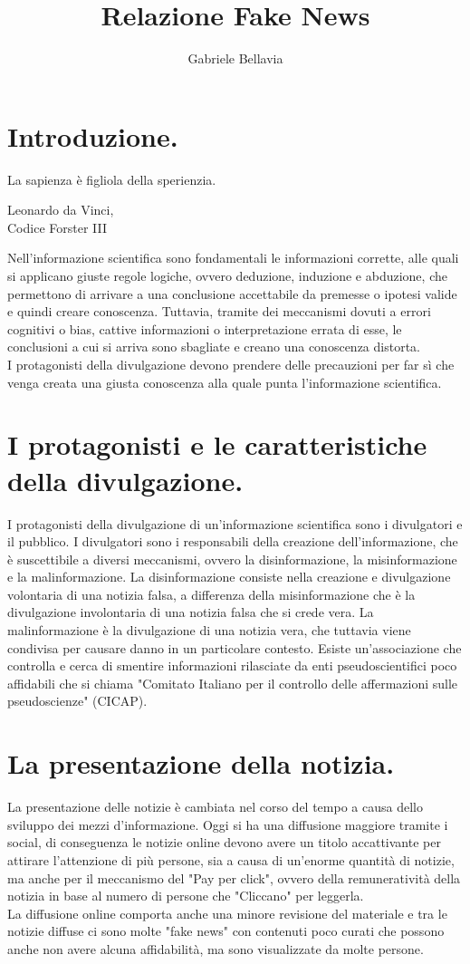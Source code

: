 \documentclass[a4paper]{article}
\title{Relazione Fake News}
\author{Gabriele Bellavia}
\begin{document}
\maketitle

\section*{Introduzione.}
\epigraph{La sapienza è figliola della sperienzia.}%
{Leonardo da Vinci, \\ Codice Forster III}
Nell'informazione scientifica sono fondamentali le informazioni corrette, alle quali si applicano giuste regole logiche, ovvero deduzione, induzione e abduzione, che permettono di arrivare a una conclusione accettabile da premesse o ipotesi valide e quindi creare conoscenza.
Tuttavia, tramite dei meccanismi dovuti a errori cognitivi o bias, cattive informazioni o interpretazione errata di esse, le conclusioni a cui si arriva sono sbagliate e creano una conoscenza distorta.\\
I protagonisti della divulgazione devono prendere delle precauzioni per far sì che venga creata una giusta conoscenza alla quale punta l'informazione scientifica.

\section*{I protagonisti e le caratteristiche della \mbox{divulgazione}.}
I protagonisti della divulgazione di un'informazione scientifica sono
i divulgatori e il pubblico.
I divulgatori sono i responsabili della creazione dell'informazione, che è suscettibile a diversi meccanismi, ovvero la disinformazione, la misinformazione e la malinformazione.
La disinformazione consiste nella creazione e divulgazione volontaria di una notizia falsa, a differenza della misinformazione che è la divulgazione
involontaria di una notizia falsa che si crede vera. La
malinformazione è la divulgazione di una notizia vera, che tuttavia
viene condivisa per causare danno in un particolare contesto.
Esiste un'associazione che controlla e cerca di smentire informazioni rilasciate da enti pseudoscientifici poco affidabili che si chiama "Comitato Italiano per il controllo delle affermazioni sulle
pseudoscienze" (CICAP).



\section{La presentazione della notizia.}
La presentazione delle notizie è cambiata nel corso del tempo a causa
dello sviluppo dei mezzi d'informazione.
Oggi si ha una diffusione maggiore tramite i social, di conseguenza le notizie online devono avere un titolo accattivante per attirare l'attenzione di più
persone, sia a causa di un'enorme quantità di notizie, ma anche per il meccanismo del "Pay per click", ovvero della remuneratività della notizia in base al numero di persone che "Cliccano" per leggerla.\\
La diffusione online comporta anche una minore revisione del materiale e tra le notizie diffuse ci sono molte "fake news" con contenuti poco curati che possono anche non avere alcuna affidabilità, ma sono visualizzate da molte persone.
\end{document}
